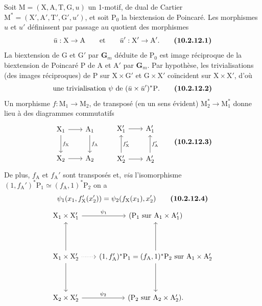 \documentclass[11pt,leqno]{article}
\begin{document}
Soit \(\mathrm{M}=(\mathrm{X},\mathrm{A},\mathrm{T},\mathrm{G},u)\)
un 1-motif, de dual de Cartier
\(\mathrm{M}^{*}=(\mathrm{X}',\mathrm{A}',\mathrm{T}',
\mathrm{G}',u')\), et soit \(\mathrm{P}_0\) la biextension de
Poincaré. Les morphismes \(u\) et \(u'\) définissent par passage
au quotient des morphismes
\[
\bar{u}:\mathrm{X}\to\mathrm{A}
\qquad\text{et}\qquad
\bar{u}':\mathrm{X}'\to\mathrm{A}'.
\tag*{\textbf{(10.2.12.1)}}
\]
La biextension de \(\mathrm{G}\) et \(\mathrm{G}'\) par
\(\mathbf{G}_m\) déduite de \(\mathrm{P}_0\) est image réciproque
de la biextension de Poincaré \(\mathrm{P}\) de \(\mathrm{A}\)
et \(\mathrm{A}'\) par \(\mathbf{G}_m\). Par hypothèse, les
trivialisations (des images réciproques) de \(\mathrm{P}\) sur
\(\mathrm{X}\times\mathrm{G}'\) et
\(\mathrm{G}\times\mathrm{X}'\) coïncident sur
\(\mathrm{X}\times\mathrm{X}'\), d’où
\[
\text{une trivialisation }\psi\text{ de }
(\bar{u}\times\bar{u}')^{*}\mathrm{P}.
\tag*{\textbf{(10.2.12.2)}}
\]
Un morphisme \(f:\mathrm{M}_1\to\mathrm{M}_2\), de transposé
(en un sens évident) \(\mathrm{M}_2^{*}\to\mathrm{M}_1^{*}\)
donne lieu à des diagrammes commutatifs
\[
\begin{tikzcd}[row sep=2.5em, column sep=2em]
\mathrm{X}_1 \arrow[r] \arrow[d, "f_{\mathrm{X}}"] &
\mathrm{A}_1 \arrow[d, "f_{\mathrm{A}}"]\\
\mathrm{X}_2 \arrow[r] & \mathrm{A}_2
\end{tikzcd}
\qquad
\begin{tikzcd}[row sep=2.5em, column sep=2em]
\mathrm{X}_1' \arrow[r] & \mathrm{A}_1'\\
\mathrm{X}_2' \arrow[r] \arrow[u, "f_{\mathrm{X}}'"'] &
\mathrm{A}_2' \arrow[u, "f_{\mathrm{A}}'"']
\end{tikzcd}
\tag*{\textbf{(10.2.12.3)}}
\]
De plus, \(f_{\mathrm{A}}\) et \(f_{\mathrm{A}}'\) sont transposés
et, \textit{via} l’isomorphisme
\((1,f_{\mathrm{A}}')^{*}\mathrm{P}_1
\simeq(f_{\mathrm{A}},1)^{*}\mathrm{P}_2\) on a
\[
\psi_1(x_1,f_{\mathrm{X}}'(x_2'))
=\psi_2(f_{\mathrm{X}}(x_1),x_2')
\tag*{\textbf{(10.2.12.4)}}
\]
\[
\begin{tikzcd}[row sep=4em, column sep=2em]
\mathrm{X}_1\times\mathrm{X}_1' \arrow[r, "\psi_1"] &
(\mathrm{P}_1\text{ sur }\mathrm{A}_1\times\mathrm{A}_1')
\\
\mathrm{X}_1\times\mathrm{X}_2'
  \arrow[u] \arrow[d] \arrow[r, dotted] &
(1,f_{\mathrm{A}}')^{*}\mathrm{P}_1
=(f_{\mathrm{A}},1)^{*}\mathrm{P}_2
\text{ sur }\mathrm{A}_1\times\mathrm{A}_2'
  \arrow[u] \arrow[d]
\\
\mathrm{X}_2\times\mathrm{X}_2' \arrow[r, "\psi_2"] &
(\mathrm{P}_2\text{ sur }\mathrm{A}_2\times\mathrm{A}_2').
\end{tikzcd}
\]
\end{document}
